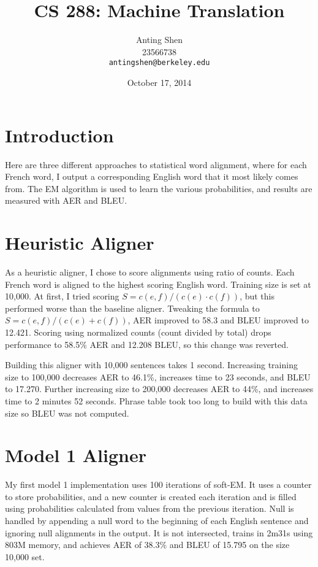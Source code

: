\documentclass[11pt]{article}
\title{CS 288: Machine Translation}
\author{Anting Shen \\
  23566738 \\
  {\tt antingshen@berkeley.edu} \\
}
\date{October 17, 2014}
\begin{document}
\maketitle

\section{Introduction}
Here are three different approaches to statistical word alignment, where for each French word,
I output a corresponding English word that it most likely comes from. The EM algorithm is used
to learn the various probabilities, and results are measured with AER and BLEU.

\section{Heuristic Aligner}

As a heuristic aligner, I chose to score alignments using ratio of counts. Each French word
is aligned to the highest scoring English word. Training size is set at 10,000.
At first, I tried scoring $S = c(e, f) / (c(e) \cdot c(f))$, but this performed worse than the
baseline aligner. Tweaking the formula to $S = c(e, f) / (c(e) + c(f))$, AER improved to 58.3%
and BLEU improved to 12.421. Scoring using normalized counts (count divided by total) drops
performance to 58.5\% AER and 12.208 BLEU, so this change was reverted.

Building this aligner with 10,000 sentences takes 1 second. Increasing training size to 100,000
decreases AER to 46.1\%, increases time to 23 seconds, and BLEU to 17.270. Further increasing
size to 200,000 decreases AER to 44\%, and increases time to 2 minutes 52 seconds. Phrase table
took too long to build with this data size so BLEU was not computed.

\section{Model 1 Aligner}

My first model 1 implementation uses 100 iterations of soft-EM. It uses a counter to store
probabilities, and a new counter is created each iteration and is filled using probabilities
calculated from values from the previous iteration. Null is handled by appending a null word to
the beginning of each English sentence and ignoring null alignments in the output.
It is not intersected, trains in 2m31s using 803M memory, and achieves AER of 38.3\%
and BLEU of 15.795 on the size 10,000 set.
\end{document}
